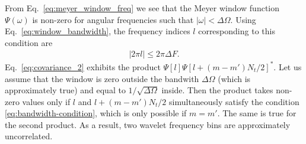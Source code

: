 \documentclass{article}
\begin{document}
From Eq.~\eqref{eq:meyer_window_freq} we see that the Meyer window function $\Psi(\omega)$ is non-zero for angular frequencies such that $|\omega| < \Delta \Omega $. Using Eq.~\eqref{eq:window_bandwidth}, the frequency indices $l$ corresponding to this condition are
\begin{align}
\label{eq:bandwidth-condition}
    \left| 2 \pi l \right| \leq 2 \pi \Delta F.
\end{align}
Eq.~\eqref{eq:covariance_2} exhibits the product $\Psi[l] \Psi[l + (m-m') N_t / 2]^{\ast}$. Let us assume that the window is zero outside the bandwith $\Delta \Omega$ (which is approximately true) and equal to $1/\sqrt{\Delta\Omega}$ inside. Then the product takes non-zero values only if $l$ and $l + (m-m') N_t / 2$ simultaneously satisfy the condition \eqref{eq:bandwidth-condition}, which is only possible if $m=m'$. The same is true for the second product. As a result, two wavelet frequency bins are approximately uncorrelated.
\end{document}
